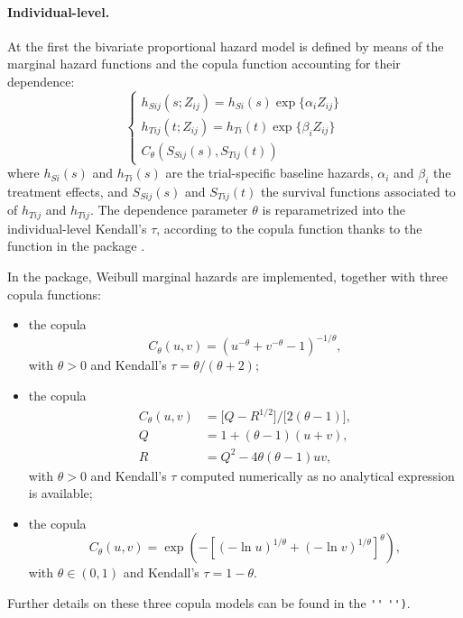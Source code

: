 \documentclass[article,shortnames, nojss]{jss}\usepackage[]{graphicx}\usepackage[]{color}
\begin{document}
\paragraph{Individual-level.}
At the first the bivariate proportional hazard model is defined
  by means of the marginal hazard functions and the copula function
  accounting for their dependence:
  \begin{equation}
    \begin{cases}
      h_{Sij}(s; Z_{ij}) = h_{Si}(s) \exp\big\{
        \alpha_i Z_{ij} 
      \big\}\\
      h_{Tij}(t; Z_{ij}) = h_{Ti}(t) \exp\big\{
        \beta_i Z_{ij}
      \big\}\\
      C_\theta(S_{Sij}(s), S_{Tij}(t))
    \end{cases}
    \label{eq:copulaModel}
  \end{equation}
  where $h_{Si}(s)$ and $h_{Ti}(s)$ are the trial-specific baseline hazards,
  $\alpha_i$ and $\beta_i$ the treatment effects,
  and $S_{Sij}(s)$ and $S_{Tij}(t)$ the survival functions associated to
  of $h_{Tij}$ and $h_{Tij}$.
The dependence parameter $\theta$
  is reparametrized into the individual-level Kendall's $\tau$,
  according to the copula function
  thanks to the  function in the 
   package \citep{R:copula, Yan07}.

In the  package,
  Weibull marginal hazards are implemented,
  together with three copula functions:
  \begin{itemize}
    \item the \cite{Clayton78} copula
      \begin{equation}
        C_\theta(u, v)= \left(u^{-\theta} + v^{-\theta} - 1\right)^{-1/\theta},
        \label{eq:clayton}
      \end{equation}
      with $\theta > 0$
      and Kendall's $\tau = \theta/(\theta+2)$;
    \item the \cite{Plackett65} copula
      \begin{align}
        C_\theta(u,v) &= \big[ Q - R^{1/2} \big] / \big[2 (\theta - 1) \big],\\
        Q &= 1 +(\theta-1)(u+v), \nonumber\\
        R &= Q^2 - 4 \theta(\theta-1)uv, \nonumber
      \end{align}
      with $\theta > 0$ and Kendall's $\tau$ computed numerically
      as no analytical expression is available;
    \item the \cite{Hougaard86} copula
      \begin{equation}
        C_\theta(u,v) = \exp\left(-\left[(- \ln u)^{1/\theta} +
        (- \ln v)^{1/\theta}\right]^\theta \right),
      \end{equation}
      with $\theta \in (0, 1)$ 
      and Kendall's $\tau = 1 - \theta$.
  \end{itemize}
Further details on these three copula models can be found in the 
  \verb|'|\verb|'|
  \verb|'|\verb|')|.
\end{document}
